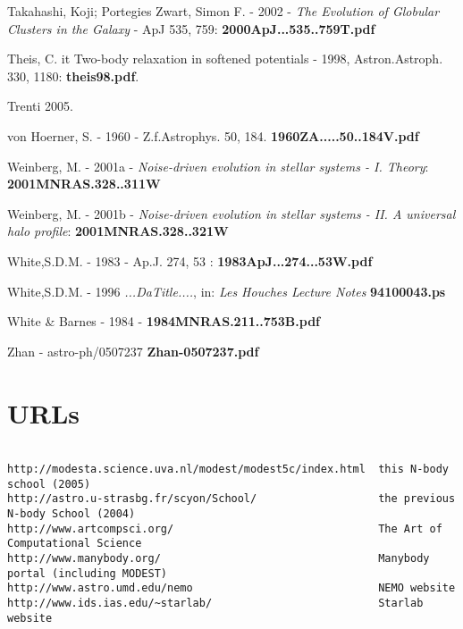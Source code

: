 Takahashi, Koji; Portegies Zwart, Simon F. - 2002 -
{\it The Evolution of Globular Clusters in the Galaxy} - ApJ 535, 759:
{\bf 2000ApJ...535..759T.pdf}

Theis, C. {it  Two-body relaxation in softened potentials} - 1998, Astron.Astroph. 330, 1180:
{\bf theis98.pdf}.

Trenti 2005.

von Hoerner, S. - 1960 - Z.f.Astrophys. 50, 184.
{\bf 1960ZA.....50..184V.pdf}


Weinberg, M. - 2001a - 
{\it Noise-driven evolution in stellar systems - I. Theory}:
{\bf 2001MNRAS.328..311W}

Weinberg, M. - 2001b - 
{\it Noise-driven evolution in stellar systems - II. A universal halo profile}:
{\bf 2001MNRAS.328..321W}


White,S.D.M. - 1983 - Ap.J. 274, 53 : {\bf 1983ApJ...274...53W.pdf}

White,S.D.M. - 1996 {\it ...DaTitle....},
in: {\it Les Houches Lecture Notes}
{\bf 94100043.ps}

White \& Barnes - 1984 - {\bf 1984MNRAS.211..753B.pdf}

Zhan - astro-ph/0507237 {\bf Zhan-0507237.pdf}

\section*{URLs}

\footnotesize
\begin{verbatim}

http://modesta.science.uva.nl/modest/modest5c/index.html  this N-body school (2005)
http://astro.u-strasbg.fr/scyon/School/                   the previous N-body School (2004)
http://www.artcompsci.org/                                The Art of Computational Science
http://www.manybody.org/                                  Manybody portal (including MODEST)
http://www.astro.umd.edu/nemo                             NEMO website
http://www.ids.ias.edu/~starlab/                          Starlab website

\end{verbatim}
\normalsize


\appendix
